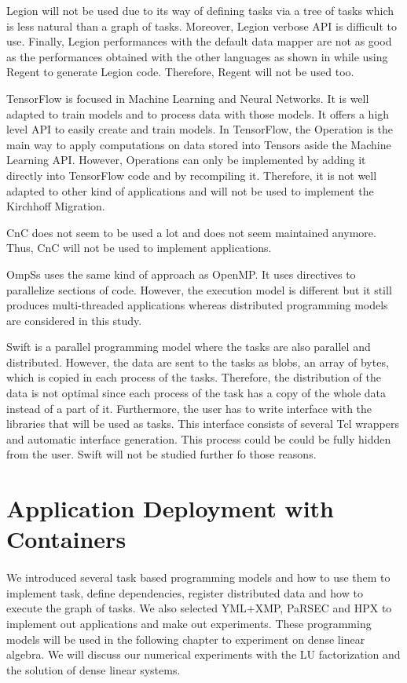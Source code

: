 Legion will not be used due to its way of defining tasks via a tree of tasks which is less natural than a graph of tasks.
Moreover, Legion verbose API is difficult to use.
Finally, Legion performances with the default data mapper are not as good as the performances obtained with the other languages as shown in \cite{GurhP2020} while using Regent to generate Legion code.
Therefore, Regent will not be used too.


TensorFlow is focused in Machine Learning and Neural Networks.
It is well adapted to train models and to process data with those models.
It offers a high level API to easily create and train models.
In TensorFlow, the Operation is the main way to apply computations on data stored into Tensors aside the Machine Learning API.
However, Operations can only be implemented by adding it directly into TensorFlow code and by recompiling it.
Therefore, it is not well adapted to other kind of applications and will not be used to implement the Kirchhoff Migration.

CnC does not seem to be used a lot and does not seem maintained anymore.
Thus, CnC will not be used to implement applications.

OmpSs uses the same kind of approach as OpenMP.
It uses directives to parallelize sections of code.
However, the execution model is different but it still produces multi-threaded applications whereas distributed programming models are considered in this study.

Swift is a parallel programming model where the tasks are also parallel and distributed.
However, the data are sent to the tasks as blobs, an array of bytes, which is copied in each process of the tasks.
Therefore, the distribution of the data is not optimal since each process of the task has a copy of the whole data instead of a part of it.
Furthermore, the user has to write interface with the libraries that will be used as tasks.
This interface consists of several Tcl wrappers and automatic interface generation.
This process could be could be fully hidden from the user.
Swift will not be studied further fo those reasons.

\section{Application Deployment with Containers}


\paragraph{}
We introduced several task based programming models and how to use them to implement task, define dependencies, register distributed data and how to execute the graph of tasks.
We also selected YML+XMP, PaRSEC and HPX to implement out applications and make out experiments.
These programming models will be used in the following chapter to experiment on dense linear algebra.
We will discuss our numerical experiments with the LU factorization and the solution of dense linear systems.